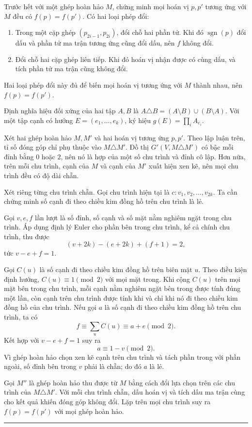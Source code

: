 \documentclass[11pt]{article}
\begin{document}
Trước hết với một ghép hoàn hảo $M$, chứng minh mọi hoán vị $p,p'$ tương ứng
với $M$ đều có $f(p)=f(p')$. Có hai loại phép đổi:
\begin{enumerate}
  \item Trong một cặp ghép $(p_{2i-1},p_{2i})$, đổi chỗ hai phần tử. Khi đó
  $\operatorname{sgn}(p)$ đổi dấu và phần tử ma trận tương ứng cũng đổi dấu,
  nên $f$ không đổi.
  \item Đổi chỗ hai cặp ghép liên tiếp. Khi đó hoán vị nhận được có cùng dấu,
  và tích phần tử ma trận cũng không đổi.
\end{enumerate}
Hai loại phép đổi này đủ để biến mọi hoán vị tương ứng với $M$ thành nhau, nên
$f(p)=f(p')$.

Định nghĩa hiệu đối xứng của hai tập $A,B$ là
$A\triangle B=(A\setminus B)\cup(B\setminus A)$. Với một tập cạnh có hướng
$E=(e_1,\ldots,e_k)$, ký hiệu $g(E)=\prod_i A_{e_i}$.

Xét hai ghép hoàn hảo $M,M'$ và hai hoán vị tương ứng $p,p'$. Theo lập luận
trên, tỉ số đóng góp chỉ phụ thuộc vào $M\triangle M'$. Đồ thị
$G'(V,M\triangle M')$ có bậc mỗi đỉnh bằng $0$ hoặc $2$, nên nó là hợp của một
số chu trình và đỉnh cô lập. Hơn nữa, trên mỗi chu trình, cạnh của $M$ và cạnh
của $M'$ xuất hiện xen kẽ, nên mọi chu trình đều có độ dài chẵn.

Xét riêng từng chu trình chẵn. Gọi chu trình hiện tại là
$c:v_1,v_2,\ldots,v_{2k}$. Ta cần chứng minh số cạnh đi theo chiều kim đồng hồ
trên chu trình là lẻ.

Gọi $v,e,f$ lần lượt là số đỉnh, số cạnh và số mặt nằm nghiêm ngặt trong chu
trình. Áp dụng định lý Euler cho phần bên trong chu trình, kể cả chính chu
trình, thu được
\[
  (v+2k)-(e+2k)+(f+1)=2,
\]
tức $v-e+f=1$.

Gọi $C(u)$ là số cạnh đi theo chiều kim đồng hồ trên biên mặt $u$. Theo điều
kiện định hướng, $C(u)\equiv 1\pmod 2$ với mọi mặt trong. Khi cộng $C(u)$ trên
mọi mặt bên trong chu trình, mỗi cạnh nằm nghiêm ngặt bên trong được tính đúng
một lần, còn cạnh trên chu trình được tính khi và chỉ khi nó đi theo chiều kim
đồng hồ của chu trình. Nếu gọi $a$ là số cạnh đi theo chiều kim đồng hồ trên
chu trình, ta có
\[
  f\equiv \sum_u C(u) \equiv a+e \pmod 2.
\]
Kết hợp với $v-e+f=1$ suy ra
\[
  a\equiv 1-v \pmod 2.
\]
Vì ghép hoàn hảo chọn xen kẽ cạnh trên chu trình và tách phần trong với phần
ngoài, số đỉnh bên trong $v$ phải là chẵn; do đó $a$ là lẻ.

Gọi $M''$ là ghép hoàn hảo thu được từ $M$ bằng cách đổi lựa chọn trên các chu
trình của $M\triangle M'$. Với mỗi chu trình chẵn, dấu hoán vị và tích dấu ma
trận cùng cho kết quả khiến đóng góp không đổi. Lặp trên mọi chu trình suy ra
$f(p)=f(p')$ với mọi ghép hoàn hảo.
\hfill\rule{0.55em}{0.55em}
\end{document}
